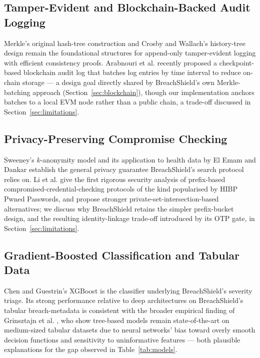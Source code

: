 \documentclass[conference]{IEEEtran}
\begin{document}
\subsection{Tamper-Evident and Blockchain-Backed Audit Logging}
Merkle's original hash-tree construction \cite{merkle1988digital} and Crosby and Wallach's history-tree design \cite{crosby2009efficient} remain the foundational structures for append-only tamper-evident logging with efficient consistency proofs. Arabnouri et al. \cite{arabnouri2024secure} recently proposed a checkpoint-based blockchain audit log that batches log entries by time interval to reduce on-chain storage --- a design goal directly shared by BreachShield's own Merkle-batching approach (Section~\ref{sec:blockchain}), though our implementation anchors batches to a local EVM node rather than a public chain, a trade-off discussed in Section~\ref{sec:limitations}.

\subsection{Privacy-Preserving Compromise Checking}
Sweeney's $k$-anonymity model \cite{sweeney2002k} and its application to health data by El Emam and Dankar \cite{elemam2008protecting} establish the general privacy guarantee BreachShield's search protocol relies on. Li et al. \cite{li2019protocols} give the first rigorous security analysis of prefix-based compromised-credential-checking protocols of the kind popularised by HIBP Pwned Passwords, and propose stronger private-set-intersection-based alternatives; we discuss why BreachShield retains the simpler prefix-bucket design, and the resulting identity-linkage trade-off introduced by its OTP gate, in Section~\ref{sec:limitations}.

\subsection{Gradient-Boosted Classification and Tabular Data}
Chen and Guestrin's XGBoost \cite{chen2016xgboost} is the classifier underlying BreachShield's severity triage. Its strong performance relative to deep architectures on BreachShield's tabular breach-metadata is consistent with the broader empirical finding of Grinsztajn et al. \cite{grinsztajn2022why}, who show tree-based models remain state-of-the-art on medium-sized tabular datasets due to neural networks' bias toward overly smooth decision functions and sensitivity to uninformative features --- both plausible explanations for the gap observed in Table~\ref{tab:models}.
\end{document}
